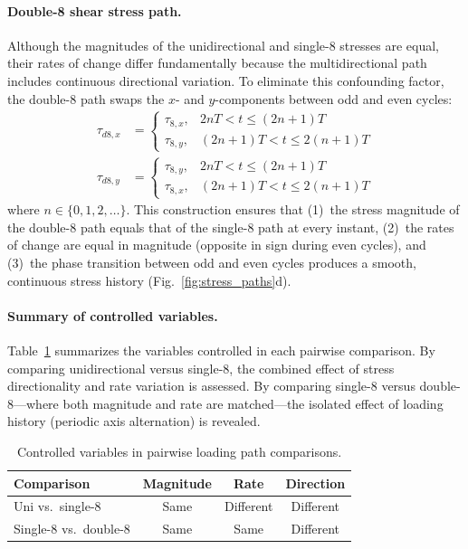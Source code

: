 \paragraph{Double-8 shear stress path.}
Although the magnitudes of the unidirectional and single-8 stresses are equal, their rates of change differ fundamentally because the multidirectional path includes continuous directional variation. To eliminate this confounding factor, the double-8 path swaps the $x$- and $y$-components between odd and even cycles:
\begin{align}
  \tau_{d8,x} &= \begin{cases}
    \tau_{8,x}, & 2nT < t \leq (2n+1)T \\
    \tau_{8,y}, & (2n+1)T < t \leq 2(n+1)T
  \end{cases}
  \label{eq:tau_d8x} \\[4pt]
  \tau_{d8,y} &= \begin{cases}
    \tau_{8,y}, & 2nT < t \leq (2n+1)T \\
    \tau_{8,x}, & (2n+1)T < t \leq 2(n+1)T
  \end{cases}
  \label{eq:tau_d8y}
\end{align}
where $n \in \{0, 1, 2, \ldots\}$. This construction ensures that (1)~the stress magnitude of the double-8 path equals that of the single-8 path at every instant, (2)~the rates of change are equal in magnitude (opposite in sign during even cycles), and (3)~the phase transition between odd and even cycles produces a smooth, continuous stress history (Fig.~\ref{fig:stress_paths}d).

\paragraph{Summary of controlled variables.}
Table~\ref{tab:controlled_variables} summarizes the variables controlled in each pairwise comparison. By comparing unidirectional versus single-8, the combined effect of stress directionality and rate variation is assessed. By comparing single-8 versus double-8---where both magnitude and rate are matched---the isolated effect of loading history (periodic axis alternation) is revealed.

\begin{table}[t]
  \centering
  \caption{Controlled variables in pairwise loading path comparisons.}
  \label{tab:controlled_variables}
  \begin{tabular}{@{}lccc@{}}
    \toprule
    Comparison & Magnitude & Rate & Direction \\
    \midrule
    Uni vs.\ single-8   & Same & Different & Different \\
    Single-8 vs.\ double-8 & Same & Same      & Different \\
    \bottomrule
  \end{tabular}
\end{table}

